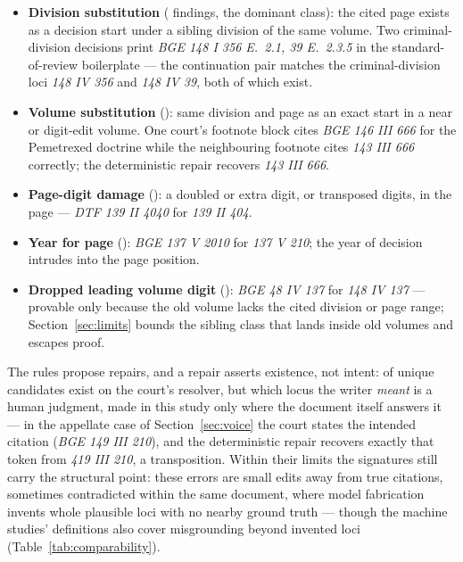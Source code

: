 \documentclass[11pt,a4paper]{article}
\begin{document}
\begin{itemize}
\item \textbf{Division substitution} (\NMechDivision{} findings, the
      dominant class): the cited page exists as a decision start under
      a sibling division of the same volume. Two criminal-division
      decisions print \emph{BGE 148 I 356 E.~2.1, 39 E.~2.3.5} in the
      standard-of-review boilerplate --- the continuation pair matches
      the criminal-division loci \emph{148 IV 356} and \emph{148 IV
      39}, both of which exist.
\item \textbf{Volume substitution} (\NMechVolume{}): same division and
      page as an exact start in a near or digit-edit volume. One
      court's footnote block cites \emph{BGE 146 III 666} for the
      Pemetrexed doctrine while the neighbouring footnote cites
      \emph{143 III 666} correctly; the deterministic repair recovers
      \emph{143 III 666}.
\item \textbf{Page-digit damage} (\NMechPageDigit{}): a doubled or
      extra digit, or transposed digits, in the page --- \emph{DTF 139
      II 4040} for \emph{139 II 404}.
\item \textbf{Year for page} (\NMechYear{}): \emph{BGE 137 V 2010} for
      \emph{137 V 210}; the year of decision intrudes into the page
      position.
\item \textbf{Dropped leading volume digit} (\NMechDropped{}):
      \emph{BGE 48 IV 137} for \emph{148 IV 137} --- provable only
      because the old volume lacks the cited division or page range;
      Section~\ref{sec:limits} bounds the sibling class that lands
      inside old volumes and escapes proof.
\end{itemize}
The rules propose repairs, and a repair asserts existence, not intent:
\NProbeCandExist{} of \NProbeCand{} unique candidates exist on the
court's resolver, but which locus the writer \emph{meant} is a human
judgment, made in this study only where the document itself answers it
--- in the appellate case of Section~\ref{sec:voice} the court states
the intended citation (\emph{BGE 149 III 210}), and the deterministic
repair recovers exactly that token from \emph{419 III 210}, a
transposition. Within their limits the signatures still carry the
structural point: these errors are small edits away from true
citations, sometimes contradicted within the same document, where
model fabrication invents whole plausible loci with no nearby ground
truth --- though the machine studies' definitions also cover
misgrounding beyond invented loci
(Table~\ref{tab:comparability}).
\end{document}
